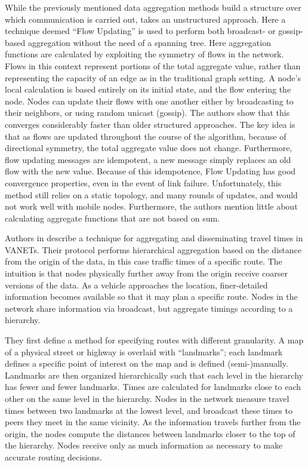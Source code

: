 \documentclass{IEEEtran}
\begin{document}
While the previously mentioned data aggregation methods build a structure over which communication is carried out, \cite{flow} takes an unstructured approach. Here a technique deemed “Flow Updating” is used to perform both broadcast- or gossip-based aggregation without the need of a spanning tree. Here aggregation functions are calculated by exploiting the symmetry of flows in the network.
Flows in this context represent portions of the total aggregate value, rather than representing the capacity of an edge as in the traditional graph setting. A node’s local calculation is based entirely on its initial state, and the flow entering the node. Nodes can update their flows with one another either by broadcasting to their neighbors, or using random unicast (gossip).
The authors show that this converges considerably faster than older structured approaches. The key idea is that as flows are updated throughout the course of the algorithm, because of directional symmetry, the total aggregate value does not change. 
Furthermore, flow updating messages are idempotent, a new message simply replaces an old flow with the new value. Because of this idempotence, Flow Updating has good convergence properties, even in the event of link failure. Unfortunately, this method still relies on a static topology, and many rounds of updates, and would not work well with mobile nodes. Furthermore, the authors mention little about calculating aggregate functions that are not based on sum.

Authors in \cite{landmark} describe a technique for aggregating and disseminating travel times in VANETs. Their protocol performs hierarchical aggregation based on the distance from the origin of the data, in this case traffic times of a specific route. The intuition is that nodes physically further away from the origin receive coarser versions of the data. As a vehicle approaches the location, finer-detailed information becomes available so that it may plan a specific route. Nodes in the network share information via broadcast, but aggregate timings according to a hierarchy.

They first define a method for specifying routes with different granularity. A map of a physical street or highway is overlaid with “landmarks”; each landmark defines a specific point of interest on the map and is defined (semi-)manually. Landmarks are then organized hierarchically such that each level in the hierarchy has fewer and fewer landmarks.
Times are calculated for landmarks close to each other on the same level in the hierarchy. Nodes in the network measure travel times between two landmarks at the lowest level, and broadcast these times to peers they meet in the same vicinity. As the information travels further from the origin, the nodes compute the distances between landmarks closer to the top of the hierarchy.  Nodes receive only as much information as necessary to make accurate routing decisions.
\end{document}
